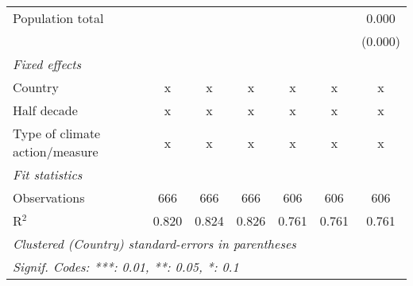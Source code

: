 \begin{tabular}{lcccccc}
   Population total                         &         &               &               &                &                & 0.000\\   
                                            &         &               &               &                &                & (0.000)\\   
   \emph{Fixed effects}\\
   Country                                  & x       & x             & x             & x              & x              & x\\  
   Half decade                              & x       & x             & x             & x              & x              & x\\  
   Type of climate action/measure           & x       & x             & x             & x              & x              & x\\  
   \midrule \emph{Fit statistics}\\
   Observations                             & 666     & 666           & 666           & 606            & 606            & 606\\  
   R$^2$                                    & 0.820   & 0.824         & 0.826         & 0.761          & 0.761          & 0.761\\  
   \midrule
   \multicolumn{7}{l}{\emph{Clustered (Country) standard-errors in parentheses}}\\
   \multicolumn{7}{l}{\emph{Signif. Codes: ***: 0.01, **: 0.05, *: 0.1}}\\
\end{tabular}
\par\endgroup


